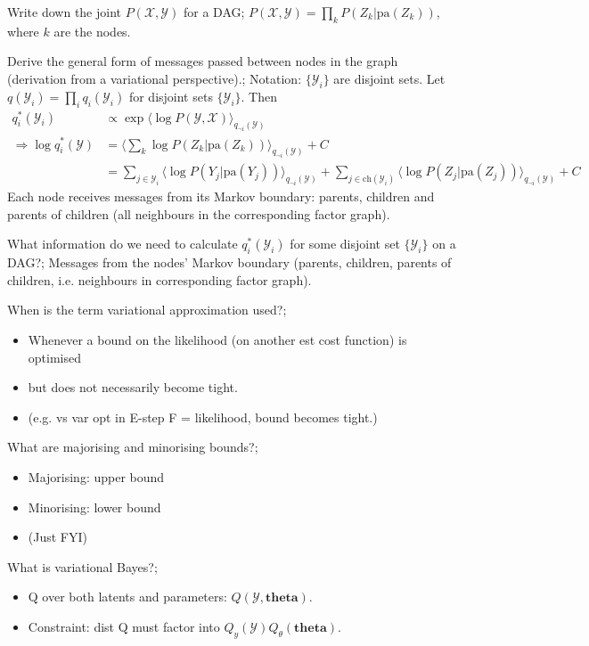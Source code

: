 \documentclass{article}
\begin{document}
Write down the joint $P(\mathcal{X, Y})$ for a DAG; $P(\mathcal{X, Y}) = \prod_k P(Z_k|\text{pa}(Z_k))$, where $k$ are the nodes.

Derive the general form of messages passed between nodes in the graph (derivation from a variational perspective).; Notation: $\{\mathcal{Y}_i\}$ are disjoint sets.  Let $q(\mathcal{Y}_i) = \prod_iq_i(\mathcal{Y}_i)$ for disjoint sets $\{\mathcal{Y}_i\}$. Then \begin{align*} q_i^*(\mathcal{Y}_i) &\propto \exp \langle \log P(\mathcal{Y, X}) \rangle_{q_{\neg i}(\mathcal{Y})} \\ \Rightarrow \log q^*_i(\mathcal{Y}) &= \langle \sum_k \log P(Z_k |\text{pa}(Z_k)) \rangle_{q_{\neg i}(\mathcal{Y})} + C\\ &= \sum_{j\in \mathcal{Y}_i} \langle\log P(Y_j |\text{pa}(Y_j)) \rangle_{q_{\neg i}(\mathcal{Y})} +  \sum_{j\in \text{ch}(\mathcal{Y}_i)} \langle \log P(Z_j |\text{pa}(Z_j)) \rangle_{q_{\neg i}(\mathcal{Y})} + C \end{align*} Each node receives messages from its Markov boundary: parents, children and parents of children (all neighbours in the corresponding factor graph).

What information do we need to calculate $q_i^*(\mathcal{Y}_i)$ for some disjoint set $\{\mathcal{Y}_i\}$ on a DAG?; Messages from the nodes' Markov boundary (parents, children, parents of children, i.e. neighbours in corresponding factor graph).

When is the term variational approximation used?; \begin{itemize} \item Whenever a bound on the likelihood (on another est cost function) is optimised \item but does not necessarily become tight.  \item (e.g. vs var opt in E-step F = likelihood, bound becomes tight.) \end{itemize}

What are majorising and minorising bounds?; \begin{itemize} \item Majorising: upper bound \item Minorising: lower bound \item (Just FYI) \end{itemize}

What is variational Bayes?; \begin{itemize} \item Q over both latents and parameters: $Q(\mathcal{Y}, \bm{theta})$.  \item Constraint: dist Q must factor into $Q_y(\mathcal{Y})Q_\theta(\bm{theta})$.  \end{itemize}
\end{document}
